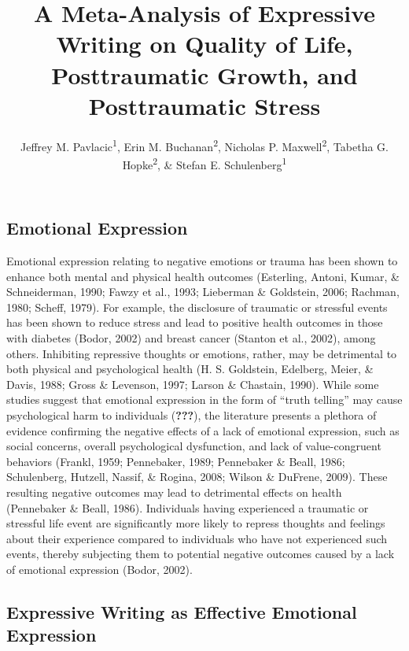 \documentclass[english,man, mask]{apa6}
\title{A Meta-Analysis of Expressive Writing on Quality of Life, Posttraumatic
Growth, and Posttraumatic Stress}
\author{Jeffrey M. Pavlacic\textsuperscript{1}, Erin M. Buchanan\textsuperscript{2}, Nicholas P. Maxwell\textsuperscript{2}, Tabetha G. Hopke\textsuperscript{2}, \& Stefan E. Schulenberg\textsuperscript{1}}
\affiliation{
    \vspace{0.5cm}
          \textsuperscript{1} University of Mississippi\\
          \textsuperscript{2} Missouri State University  }
\theoremstyle{definition}
\theoremstyle{definition}
\theoremstyle{definition}
\theoremstyle{remark}
\begin{document}
\maketitle

\setcounter{secnumdepth}{0}



\subsection{Emotional Expression}\label{emotional-expression}

Emotional expression relating to negative emotions or trauma has been
shown to enhance both mental and physical health outcomes (Esterling,
Antoni, Kumar, \& Schneiderman, 1990; Fawzy et al., 1993; Lieberman \&
Goldstein, 2006; Rachman, 1980; Scheff, 1979). For example, the
disclosure of traumatic or stressful events has been shown to reduce
stress and lead to positive health outcomes in those with diabetes
(Bodor, 2002) and breast cancer (Stanton et al., 2002), among others.
Inhibiting repressive thoughts or emotions, rather, may be detrimental
to both physical and psychological health (H. S. Goldstein, Edelberg,
Meier, \& Davis, 1988; Gross \& Levenson, 1997; Larson \& Chastain,
1990). While some studies suggest that emotional expression in the form
of \enquote{truth telling} may cause psychological harm to individuals
({\textbf{???}}), the literature presents a plethora of evidence
confirming the negative effects of a lack of emotional expression, such
as social concerns, overall psychological dysfunction, and lack of
value-congruent behaviors (Frankl, 1959; Pennebaker, 1989; Pennebaker \&
Beall, 1986; Schulenberg, Hutzell, Nassif, \& Rogina, 2008; Wilson \&
DuFrene, 2009). These resulting negative outcomes may lead to
detrimental effects on health (Pennebaker \& Beall, 1986). Individuals
having experienced a traumatic or stressful life event are significantly
more likely to repress thoughts and feelings about their experience
compared to individuals who have not experienced such events, thereby
subjecting them to potential negative outcomes caused by a lack of
emotional expression (Bodor, 2002).

\subsection{Expressive Writing as Effective Emotional
Expression}\label{expressive-writing-as-effective-emotional-expression}
\end{document}
